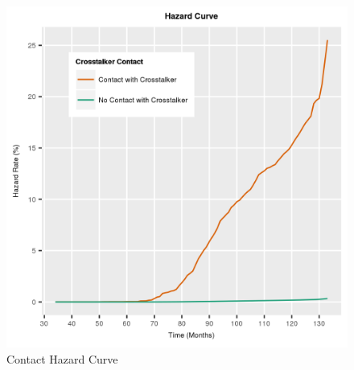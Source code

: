 \documentclass[letterpaper]{article}
\newcommand{\pat}[1]{{\textcolor{red}{Pat: #1}}}
\newcommand{\del}[1]{{\textcolor{gray}{#1}}}
\begin{document}

\begin{figure}[ht]{}
\centering
    \includegraphics[scale=0.75]{contact_Hazard_final}
    \caption{Contact Hazard Curve}
    \label{fig:ctc_haz}
\end{figure}
\end{document}
